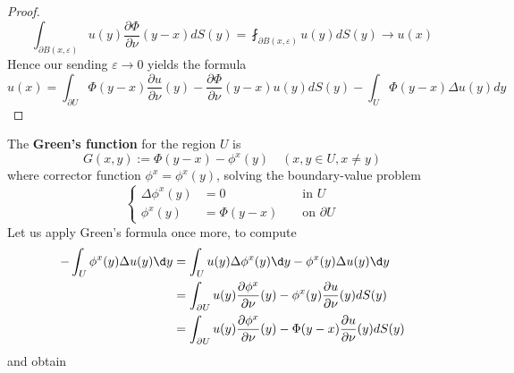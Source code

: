 \begin{lemma}
\begin{proof}
        \begin{equation*}
            \int_{\partial B(x, \varepsilon)} u(y) \frac{\partial \Phi}{\partial \nu}(y-x) d S(y)=\fint_{\partial B(x, \varepsilon)} u(y) d S(y) \rightarrow u(x)
        \end{equation*}
        Hence our sending $\varepsilon \rightarrow 0$ yields the formula
        \begin{equation*}
            u(x)= \int_{\partial U} \Phi(y-x) \frac{\partial u}{\partial \nu}(y)- \frac{\partial \Phi}{\partial \nu}(y-x) u(y) dS(y)
            -\int_U \Phi(y-x) \Delta u(y) d y
        \end{equation*}
    \end{proof}
\end{lemma}

\begin{definition}
    The \textbf{Green's function} for the region $U$ is
    \begin{equation*}
        G(x, y):=\Phi(y-x)-\phi^x(y) \quad(x, y \in U, x \neq y)
    \end{equation*}
    where corrector function $\phi^x=\phi^x(y)$, solving the boundary-value problem
    \begin{equation*}
        \left\{\begin{aligned}
            \Delta \phi^x (y) & =0         &  & \text { in } U          \\
            \phi^x (y)        & =\Phi(y-x) &  & \text { on } \partial U
        \end{aligned}\right.
    \end{equation*}
    Let us apply Green's formula once more, to compute
    \begin{equation*}
        \begin{aligned}
            -\int_U \phi^x(y) \Delta u(y)\d y & = \int_U u(y) \Delta \phi^x(y) \d y -  \phi^x(y) \Delta u(y)\d y                                                    \\
                                              & =\int_{\partial U} u(y) \frac{\partial \phi^x}{\partial \nu}(y)-\phi^x(y) \frac{\partial u}{\partial \nu}(y) d S(y) \\
                                              & =\int_{\partial U} u(y) \frac{\partial \phi^x}{\partial \nu}(y)-\Phi(y-x) \frac{\partial u}{\partial \nu}(y) d S(y)
        \end{aligned}
    \end{equation*}
    and obtain
    \begin{equation*}

\end{equation*}
\end{definition}
